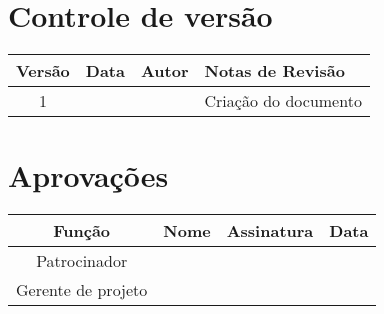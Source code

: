 \section{Controle de versão}

\begin{table}[H]
	\begin{tabularx}{\textwidth}{| c | c | X | X |}
		\hline
		\textbf{Versão} & \textbf{Data} & \textbf{Autor}      & \textbf{Notas de Revisão} \\
		\hline
		1                &               & \projectManagerName{} & Criação do documento     \\
		\hline
	\end{tabularx}
	\centering
\end{table}

\section{Aprovações}

\begin{table}[H]
	\begin{tabularx}{\textwidth}{| c | c | X | c |}
		\hline
		\textbf{Função}  & \textbf{Nome}       & \textbf{Assinatura}      & \textbf{Data} \\
		\hline
		Patrocinador       & \projectSponsorName{} & \projectSponsorSignature{} &               \\
		\hline
		Gerente de projeto & \projectManagerName{} & \projectManagerSignature{} &               \\
		\hline
	\end{tabularx}
	\centering
\end{table}

